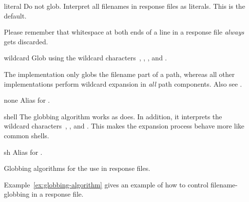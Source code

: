 \begin{table}[htbp]
  \begin{minipage}{\linewidth}
    \begin{codelist}
    \item[literal]\itemend Do not glob.  Interpret all filenames in
      response files as literals. This is the default.

      Please remember that whitespace at both ends of a line in a
      response file \emph{always} gets discarded.

    \item[wildcard]\itemend Glob using the wildcard
      characters~, \sample{*}, \sample{[}, and
        \sample{]}.

      The  implementation only globs the filename
      part of a path, whereas all other implementations perform
      wildcard expansion in \emph{all} path components.  Also see
      .

    \item[none]\itemend Alias for .

    \item[shell]\itemend The  globbing algorithm works as
       does.  In addition, it interprets the wildcard
      characters~\sample{\{}, \sample{\atsign}, and
      \sample{\squiggle}.  This makes the expansion process behave
      more like common  shells.

    \item[sh]\itemend Alias for .
    \end{codelist}
  \end{minipage}

  \caption[Globbing algorithms]{Globbing algorithms for the use in
    response files.\label{tab:globbing-algorithms}}

\end{table}

Example~\ref{ex:globbing-algorithm} gives an example of how to control
filename-globbing in a response file.

